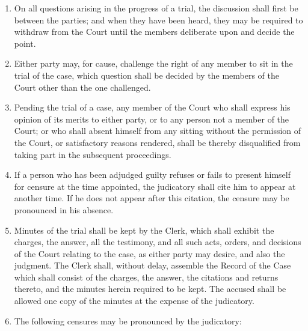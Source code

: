 \documentclass[
]{book}
\begin{document}
\begin{enumerate}
\item
  On all questions arising in the progress of a trial, the discussion shall first be between the parties; and when they have been heard, they may be required to withdraw from the Court until the members deliberate upon and decide the point.
\item
  Either party may, for cause, challenge the right of any member to sit in the trial of the case, which question shall be decided by the members of the Court other than the one challenged.
\item
  Pending the trial of a case, any member of the Court who shall express his opinion of its merits to either party, or to any person not a member of the Court; or who shall absent himself from any sitting without the permission of the Court, or satisfactory reasons rendered, shall be thereby disqualified from taking part in the subsequent proceedings.
\item
  If a person who has been adjudged guilty refuses or fails to present himself for censure at the time appointed, the judicatory shall cite him to appear at another time. If he does not appear after this citation, the censure may be pronounced in his absence.
\item
  Minutes of the trial shall be kept by the Clerk, which shall exhibit the charges, the answer, all the testimony, and all such acts, orders, and decisions of the Court relating to the case, as either party may desire, and also the judgment. The Clerk shall, without delay, assemble the Record of the Case which shall consist of the charges, the answer, the citations and returns thereto, and the minutes herein required to be kept. The accused shall be allowed one copy of the minutes at the expense of the judicatory.
\item
  The following censures may be pronounced by the judicatory:


\end{enumerate}
\end{document}
